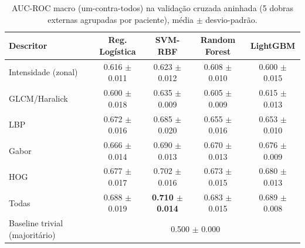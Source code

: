 \begin{table}[ht]
\centering
\caption{AUC-ROC macro (um-contra-todos) na validação cruzada aninhada (5 dobras externas agrupadas por paciente), média $\pm$ desvio-padrão.}
\label{tab:main}
\footnotesize
\setlength{\tabcolsep}{4pt}
\begin{tabular}{lcccc}
\hline
Descritor & Reg. Logística & SVM-RBF & Random Forest & LightGBM \\
\hline
Intensidade (zonal) & 0.616 $\pm$ 0.011 & 0.623 $\pm$ 0.012 & 0.608 $\pm$ 0.010 & 0.600 $\pm$ 0.015 \\
GLCM/Haralick & 0.600 $\pm$ 0.018 & 0.635 $\pm$ 0.009 & 0.605 $\pm$ 0.009 & 0.615 $\pm$ 0.013 \\
LBP & 0.672 $\pm$ 0.016 & 0.685 $\pm$ 0.020 & 0.655 $\pm$ 0.016 & 0.653 $\pm$ 0.010 \\
Gabor & 0.666 $\pm$ 0.014 & 0.690 $\pm$ 0.013 & 0.670 $\pm$ 0.013 & 0.676 $\pm$ 0.009 \\
HOG & 0.677 $\pm$ 0.017 & 0.702 $\pm$ 0.016 & 0.673 $\pm$ 0.015 & 0.680 $\pm$ 0.013 \\
Todas & 0.688 $\pm$ 0.019 & \textbf{0.710 $\pm$ 0.014} & 0.683 $\pm$ 0.015 & 0.689 $\pm$ 0.008 \\
\hline
Baseline trivial (majoritário) & \multicolumn{4}{c}{0.500 $\pm$ 0.000} \\
\hline
\end{tabular}
\end{table}